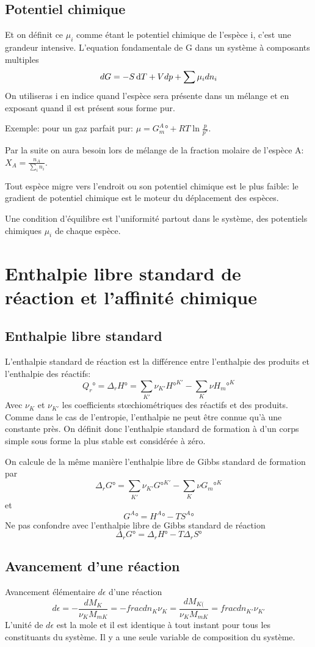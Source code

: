 \subsection{Potentiel chimique}
Et on définit ce $\mu_i$ comme étant le potentiel chimique de l'espèce i,
c'est une grandeur intensive.
L'equation fondamentale de G dans un système à composants multiples
\[ dG = -S\operatorname{d}\! T+Vdp+\sum \mu_idn_i \]
On utiliseras i en indice quand l'espèce sera présente dans un mélange et
en exposant quand il est présent sous forme pur.

Exemple: pour un gaz parfait pur: $\mu = G_m^A°+RT \ln \frac p{p°}$.

Par la suite on aura besoin lors de mélange de la fraction molaire de
l'espèce A: $ X_A = \frac{n_A}{\sum_in_i}$.

Tout espèce migre vers l'endroit ou son potentiel chimique est le plus faible:
le gradient de potentiel chimique est le moteur du déplacement des espèces.

Une condition d'équilibre est l'uniformité partout dans le système,
des potentiels chimiques $\mu_i$ de chaque espèce.

\section{Enthalpie libre standard de réaction et l'affinité chimique}
\subsection{Enthalpie libre standard}
L'enthalpie standard de réaction est la différence entre
l'enthalpie des produits et l'enthalpie des réactifs:
\[ Q_r° = \Delta_rH° = \sum_{K'}\nu_{K'}H°^{K'}-\sum_K\nu H_m°^K \]
Avec $\nu_K$ et $\nu_{K'}$ les coefficients stœchiométriques
des réactifs et des produits.
Comme dans le cas de l'entropie,
l'enthalpie ne peut être connue qu'à une constante près.
On définit donc l'enthalpie standard de formation
à 
d'un corps simple sous forme la plus stable  est considérée à zéro.

On calcule de la même manière
l'enthalpie libre de Gibbs standard de formation par
\[ \Delta_rG° = \sum_{K'}\nu_{K'}G°^{K'}-\sum_K\nu G_m°^K \]
et
\[ G^A° = H^A°-TS^A° \]
Ne pas confondre avec l'enthalpie libre de Gibbs standard de réaction
\[ \Delta_rG° = \Delta_rH°-T\Delta_rS° \]

\subsection{Avancement d'une réaction}
Avancement élémentaire $d\epsilon$ d'une réaction
\[ d\epsilon = -\frac{dM_K}{\nu_KM_{mK}} = -frac{dn_K}{\nu_K} =
\frac{dM_{K(}}{\nu_{K}M_{mK}} = frac{dn_{K'}}{\nu_{K'}} \]
L'unité de $d\epsilon$ est la mole et il est identique
à tout instant pour tous les constituants du système.
Il y a une seule variable de composition du système.


